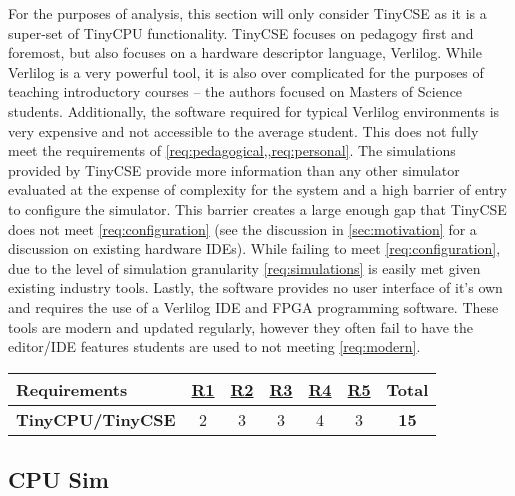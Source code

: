For the purposes of analysis, this section will only consider TinyCSE as it is a super-set of TinyCPU functionality. TinyCSE focuses on pedagogy first and foremost, but also focuses on a hardware descriptor language, Verlilog. While Verlilog is a very powerful tool, it is also over complicated for the purposes of teaching introductory courses -- the authors focused on Masters of Science students. Additionally, the software required for typical Verlilog environments is very expensive and not accessible to the average student. This does not fully meet the requirements of \cref{req:pedagogical,,req:personal}. The simulations provided by TinyCSE provide more information than any other simulator evaluated at the expense of complexity for the system and a high barrier of entry to configure the simulator. This barrier creates a large enough gap that TinyCSE does not meet \cref{req:configuration} (see the discussion in \cref{sec:motivation} for a discussion on existing hardware IDEs). While failing to meet \cref{req:configuration}, due to the level of simulation granularity \cref{req:simulations} is easily met given existing industry tools. Lastly, the software provides no user interface of it's own and requires the use of a Verlilog IDE and FPGA programming software. These tools are modern and updated regularly, however they often fail to have the editor/IDE features students are used to not meeting \cref{req:modern}.

\begin{table}[h!]
    \centering
    \begin{tabular}{lcccccc}
        \textbf{Requirements} & \textbf{\hyperref[req:personal]{R1}} & \textbf{\hyperref[req:configuration]{R2}} & \textbf{\hyperref[req:pedagogical]{R3}} & \textbf{\hyperref[req:simulations]{R4}} & \textbf{\hyperref[req:modern]{R5}} & \textbf{Total} \\ \hline
        \textbf{TinyCPU/TinyCSE \cite{Nakamura2013, McLoughlin2010}} 
        & 2 & 3 & 3 & 4 & 3 & \textbf{15} \\ 
    \end{tabular}
\end{table}

\subsection{CPU Sim}
\label{sec:review-cpu-sim}

